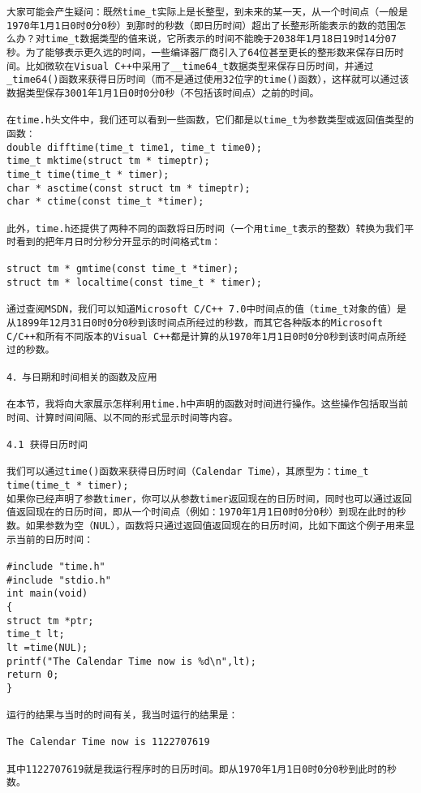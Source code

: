 \begin{verbatim}
大家可能会产生疑问：既然time_t实际上是长整型，到未来的某一天，从一个时间点（一般是1970年1月1日0时0分0秒）到那时的秒数（即日历时间）超出了长整形所能表示的数的范围怎么办？对time_t数据类型的值来说，它所表示的时间不能晚于2038年1月18日19时14分07秒。为了能够表示更久远的时间，一些编译器厂商引入了64位甚至更长的整形数来保存日历时间。比如微软在Visual C++中采用了__time64_t数据类型来保存日历时间，并通过_time64()函数来获得日历时间（而不是通过使用32位字的time()函数），这样就可以通过该数据类型保存3001年1月1日0时0分0秒（不包括该时间点）之前的时间。 

在time.h头文件中，我们还可以看到一些函数，它们都是以time_t为参数类型或返回值类型的函数： 
double difftime(time_t time1, time_t time0); 
time_t mktime(struct tm * timeptr); 
time_t time(time_t * timer); 
char * asctime(const struct tm * timeptr); 
char * ctime(const time_t *timer); 

此外，time.h还提供了两种不同的函数将日历时间（一个用time_t表示的整数）转换为我们平时看到的把年月日时分秒分开显示的时间格式tm： 

struct tm * gmtime(const time_t *timer); 
struct tm * localtime(const time_t * timer); 

通过查阅MSDN，我们可以知道Microsoft C/C++ 7.0中时间点的值（time_t对象的值）是从1899年12月31日0时0分0秒到该时间点所经过的秒数，而其它各种版本的Microsoft C/C++和所有不同版本的Visual C++都是计算的从1970年1月1日0时0分0秒到该时间点所经过的秒数。 

4．与日期和时间相关的函数及应用 

在本节，我将向大家展示怎样利用time.h中声明的函数对时间进行操作。这些操作包括取当前时间、计算时间间隔、以不同的形式显示时间等内容。 

4.1 获得日历时间 

我们可以通过time()函数来获得日历时间（Calendar Time），其原型为：time_t time(time_t * timer); 
如果你已经声明了参数timer，你可以从参数timer返回现在的日历时间，同时也可以通过返回值返回现在的日历时间，即从一个时间点（例如：1970年1月1日0时0分0秒）到现在此时的秒数。如果参数为空（NUL），函数将只通过返回值返回现在的日历时间，比如下面这个例子用来显示当前的日历时间： 

#include "time.h" 
#include "stdio.h" 
int main(void) 
{ 
struct tm *ptr; 
time_t lt; 
lt =time(NUL); 
printf("The Calendar Time now is %d\n",lt); 
return 0; 
} 

运行的结果与当时的时间有关，我当时运行的结果是： 

The Calendar Time now is 1122707619 

其中1122707619就是我运行程序时的日历时间。即从1970年1月1日0时0分0秒到此时的秒数。 


\end{verbatim}
